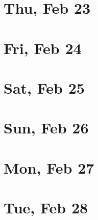 	\section{Thu, Feb 23}
		
	\section{Fri, Feb 24}
		
	\section{Sat, Feb 25}
		
	\section{Sun, Feb 26}
		
	\section{Mon, Feb 27}
		
	\section{Tue, Feb 28}
		
